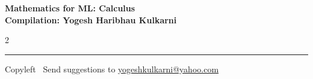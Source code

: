 \documentclass[8pt,landscape]{article}
\begin{document}
\footnotesize


\begin{center}
\Large{\textbf{Mathematics for ML: Calculus\\ Compilation: Yogesh Haribhau Kulkarni}}
\end{center}

\begin{multicols}{2}

\end{multicols}

\rule{\linewidth}{0.25pt}
\scriptsize
Copyleft \textcopyleft\  Send suggestions to
\href{http://www.yogeshkulkarni.com}{yogeshkulkarni@yahoo.com}
\end{document}
